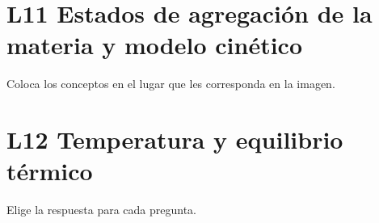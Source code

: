 \documentclass[12pt,addpoints,answers]{evalua}
\begin{document}
\begin{questions}
\begin{multicols}{2}
\end{multicols}

\section{L11 Estados de agregación de la materia y modelo cinético}

      \begin{minipage}[t][][b]{.46\textwidth}
            \question[9] Coloca los conceptos en el lugar que les corresponda en la imagen.\\

            \large
                     
      \end{minipage}\qquad\qquad%
      \begin{minipage}[t][][b]{.285\textwidth}
            \fi
      \end{minipage}

\section{L12 Temperatura y equilibrio térmico}

      \question[10] Elige la respuesta para cada pregunta.
      \begin{multicols}{2}
            \begin{parts}\footnotesize


\end{parts}
\end{multicols}
\end{questions}
\end{document}
